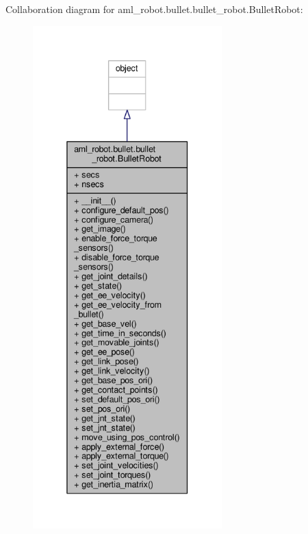 Collaboration diagram for aml\-\_\-robot.\-bullet.\-bullet\-\_\-robot.\-Bullet\-Robot\-:
\nopagebreak
\begin{figure}[H]
\begin{center}
\leavevmode
\includegraphics[height=550pt]{classaml__robot_1_1bullet_1_1bullet__robot_1_1_bullet_robot__coll__graph}
\end{center}
\end{figure}
